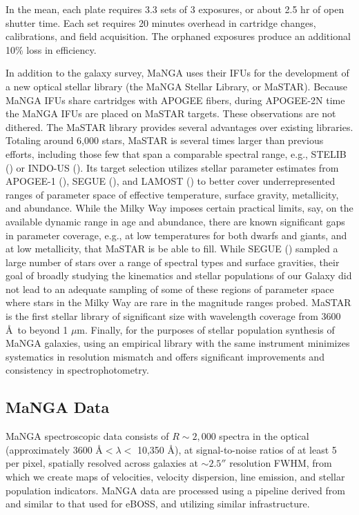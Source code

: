 In the mean, each plate requires 3.3 sets of 3 exposures, or about 2.5
hr of open shutter time. Each set requires 20 minutes overhead in
cartridge changes, calibrations, and field acquisition. The orphaned
exposures produce an additional 10\% loss in efficiency.

In addition to the galaxy survey, MaNGA uses their IFUs for the
development of a new optical stellar library (the MaNGA Stellar
Library, or MaSTAR). Because MaNGA IFUs share cartridges with APOGEE
fibers, during APOGEE-2N time the MaNGA IFUs are placed on MaSTAR
targets. These observations are not dithered. The MaSTAR library
provides several advantages over existing libraries. Totaling around
6,000 stars, MaSTAR is several times larger than previous efforts,
including those few that span a comparable spectral range, e.g.,
STELIB (\citealt{leborgne03a}) or INDO-US (\citealt{valdes04a}).  Its
target selection utilizes stellar parameter estimates from
\mbox{APOGEE-1} (\citealt{garciaperez16a}), SEGUE
(\citealt{allendeprieto08a}), and LAMOST (\citealt{lee15b}) to better
cover underrepresented ranges of parameter space of effective
temperature, surface gravity, metallicity, and abundance.  While the
Milky Way imposes certain practical limits, say, on the available
dynamic range in age and abundance, there are known significant gaps
in parameter coverage, e.g., at low temperatures for both dwarfs and
giants, and at low metallicity, that MaSTAR is be able to fill.  While
SEGUE (\citealt{yanny09a}) sampled a large number of stars over a
range of spectral types and surface gravities, their goal of broadly
studying the kinematics and stellar populations of our Galaxy did not
lead to an adequate sampling of some of these regions of parameter
space where stars in the Milky Way are rare in the magnitude ranges
probed. MaSTAR is the first stellar library of significant size with
wavelength coverage from 3600 \AA\ to beyond 1 $\mu$m. Finally, for
the purposes of stellar population synthesis of MaNGA galaxies, using
an empirical library with the same instrument minimizes systematics in
resolution mismatch and offers significant improvements and
consistency in spectrophotometry.

\subsection{MaNGA Data}
\label{sec:manga:data}

MaNGA spectroscopic data consists of $R\sim 2,000$ spectra in the
optical (approximately 3600 \AA $< \lambda <$ 10,350 \AA), at
signal-to-noise ratios of at least 5 per pixel, spatially resolved
across galaxies at $\sim 2.5''$ resolution FWHM, from which we create
maps of velocities, velocity dispersion, line emission, and stellar
population indicators. MaNGA data are processed using a pipeline
derived from and similar to that used for eBOSS, and utilizing similar
infrastructure.

